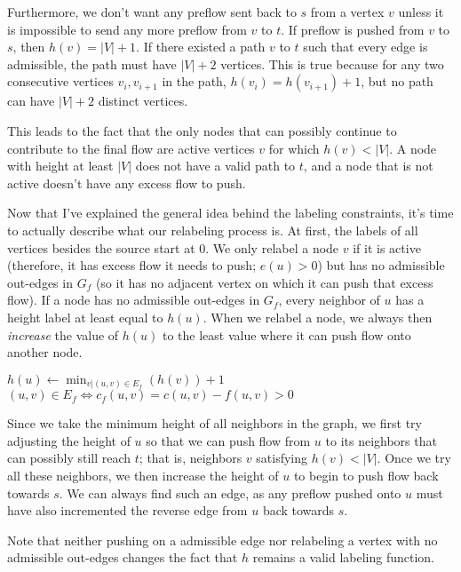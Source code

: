 Furthermore, we don't want any preflow sent back to $s$ from a vertex $v$ unless it is impossible to send any more preflow from $v$ to $t$. If preflow is pushed from $v$ to $s$, then $h(v) = |V| + 1$. If there existed a path $v$ to $t$ such that every edge is admissible, the path must have $|V| + 2$ vertices. This is true because for any two consecutive vertices $v_i,v_{i+1}$ in the path, $h(v_i) = h(v_{i+1}) + 1$, but no path can have $|V|+2$ distinct vertices.

This leads to the fact that the only nodes that can possibly continue to contribute to the final flow are active vertices $v$ for which $h(v) < |V|$. A node with height at least $|V|$ does not have a valid path to $t$, and a node that is not active doesn't have any excess flow to push.

Now that I've explained the general idea behind the labeling constraints, it's time to actually describe what our relabeling process is. At first, the labels of all vertices besides the source start at 0. We only relabel a node $v$ if it is active (therefore, it has excess flow it needs to push; $e(u) > 0$) but has no admissible out-edges in $G_f$ (so it has no adjacent vertex on which it can push that excess flow). If a node has no admissible out-edges in $G_f$, every neighbor of $u$ has a height label at least equal to $h(u)$. When we relabel a node, we always then \textit{increase} the value of $h(u)$ to the least value where it can push flow onto another node.

\noindent \begin{minipage}{\textwidth}
\begin{algorithmic}
		\State $h(u) \gets \min_{v | (u,v) \in E_f}(h(v)) + 1$
		\Comment $(u,v) \in E_f \iff c_f(u,v) = c(u,v) - f(u,v) > 0$
\EndFunction
\end{algorithmic}
\end{minipage}

Since we take the minimum height of all neighbors in the graph, we first try adjusting the height of $u$ so that we can push flow from $u$ to its neighbors that can possibly still reach $t$; that is, neighbors $v$ satisfying $h(v) < |V|$. Once we try all these neighbors, we then increase the height of $u$ to begin to push flow back towards $s$. We can always find such an edge, as any preflow pushed onto $u$ must have also incremented the reverse edge from $u$ back towards $s$.

Note that neither pushing on a admissible edge nor relabeling a vertex with no admissible out-edges changes the fact that $h$ remains a valid labeling function.

